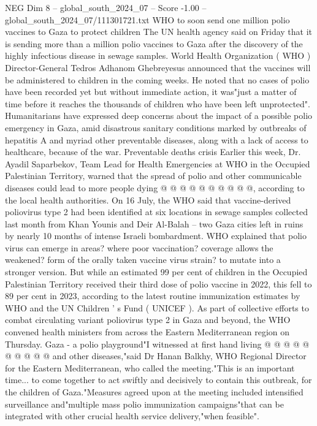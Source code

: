 \begin{textsample}{NEG Dim 8 – global\_south\_2024\_07 – Score -1.00 – global\_south\_2024\_07/111301721.txt}  \label{ex:f8_neg_354}
WHO to soon send one million polio vaccines to Gaza to protect children The UN health agency said on Friday that it is sending more than a million polio vaccines to Gaza after the discovery of the highly infectious disease in sewage samples.
World Health Organization ( WHO ) Director-General Tedros Adhanom Ghebreyesus announced that the vaccines will be administered to children in the coming weeks.
He noted that no cases of polio have been recorded yet but without immediate action, it was"just a matter of time before it reaches the thousands of children who have been left unprotected".
Humanitarians have expressed deep concerns about the impact of a possible polio emergency in Gaza, amid disastrous sanitary conditions marked by outbreaks of hepatitis A and myriad other preventable diseases, along with a lack of access to healthcare, because of the war.
Preventable deaths crisis Earlier this week, Dr.
Ayadil Saparbekov, Team Lead for Health Emergencies at WHO in the Occupied Palestinian Territory, warned that the spread of polio and other communicable diseases could lead to more people dying @ @ @ @ @ @ @ @ @ @, according to the local health authorities.
On 16 July, the WHO said that vaccine-derived poliovirus type 2 had been identified at six locations in sewage samples collected last month from Khan Younis and Deir Al-Balah -- two Gaza cities left in ruins by nearly 10 months of intense Israeli bombardment.
WHO explained that polio virus can emerge in areas? where poor vaccination? coverage allows the weakened? form of the orally taken vaccine virus strain? to mutate into a stronger version.
But while an estimated 99 per cent of children in the Occupied Palestinian Territory received their third dose of polio vaccine in 2022, this fell to 89 per cent in 2023, according to the latest routine immunization estimates by WHO and the UN Children ' s Fund ( UNICEF ).
As part of collective efforts to combat circulating variant poliovirus type 2 in Gaza and beyond, the WHO convened health ministers from across the Eastern Mediterranean region on Thursday.
Gaza - a polio playground"I witnessed at first hand living @ @ @ @ @ @ @ @ @ @ and other diseases,"said Dr Hanan Balkhy, WHO Regional Director for the Eastern Mediterranean, who called the meeting."This is an important time... to come together to act swiftly and decisively to contain this outbreak, for the children of Gaza."Measures agreed upon at the meeting included intensified surveillance and"multiple mass polio immunization campaigns"that can be integrated with other crucial health service delivery,"when feasible".

\end{textsample}
